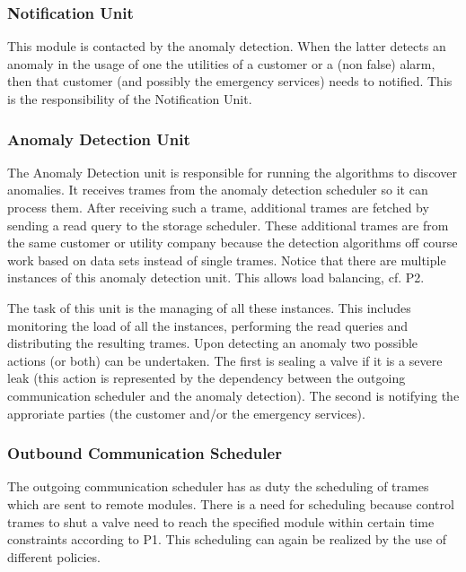 \subsubsection{Notification Unit}

\npar This module is contacted by the anomaly detection. When the latter detects
an anomaly in the usage of one the utilities of a customer or a (non false)
alarm, then that customer (and possibly the emergency services) needs to
notified. This is the responsibility of the Notification Unit.

\subsubsection{Anomaly Detection Unit}

\npar The Anomaly Detection unit is responsible for running the algorithms to
discover anomalies. It receives trames from the anomaly detection scheduler so
it can process them. After receiving such a trame, additional trames are fetched
by sending a read query to the storage scheduler. These additional trames
are from the same customer or utility company because the detection algorithms
off course work based on data sets instead of single trames. Notice that there
are multiple instances of this anomaly detection unit. This allows load
balancing, cf. P2.

\npar The task of this unit is the managing of all these instances. This
includes monitoring the load of all the instances, performing the read queries
and distributing the resulting trames. Upon detecting an anomaly two possible
actions (or both) can be undertaken. The first is sealing a valve if it is a
severe leak (this action is represented by the dependency between the outgoing
communication scheduler and the anomaly detection). The second is notifying the
approriate parties (the customer and/or the emergency services).

\subsubsection{Outbound Communication Scheduler}

\npar The outgoing communication scheduler has as duty the scheduling of
trames which are sent to remote modules. There is a need for scheduling because
control trames to shut a valve need to reach the specified module within certain
time constraints according to P1. This scheduling can again be realized by the
use of different policies.

